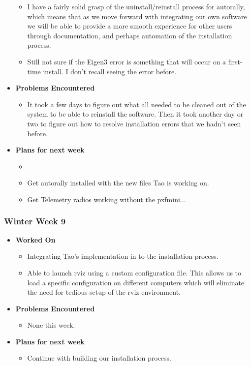 \documentclass{article}
\begin{document}
\begin{itemize}
\begin{itemize}
    \item I have a fairly solid grasp of the uninstall/reinstall process for autorally, which means that as we move forward with integrating our own software we will be able to provide a more smooth experience for other users through documentation, and perhaps automation of the installation process.

    \item Still not sure if the Eigen3 error is something that will occur on a first-time install. I don't recall seeing the error before.

    \end{itemize}

    \item {\textbf{Problems Encountered}}
    \begin{itemize}
        \item It took a few days to figure out what all needed to be cleaned out of the system to be able to reinstall the software. Then it took another day or two to figure out how to resolve installation errors that we hadn't seen before.
    \end{itemize}

    \item{\textbf{Plans for next week}}
    \begin{itemize}
        \item         \item Get autorally installed with the new files Tao is working on.
        \item Get Telemetry radios working without the pxfmini...
    \end{itemize}
\end{itemize}

\subsubsection{Winter Week 9}
\begin{itemize}
    \item {\textbf{Worked On}}
    \begin{itemize}
        \item Integrating Tao's implementation in to the installation process.
        \item Able to launch rviz using a custom configuration file. This allows us to load a specific configuration on different computers which will eliminate the need for tedious setup of the rviz environment.
    \end{itemize}

    \item {\textbf{Problems Encountered}}
    \begin{itemize}
        \item None this week.
    \end{itemize}

    \item{\textbf{Plans for next week}}
    \begin{itemize}
        \item Continue with building our installation process.
    \end{itemize}
\end{itemize}
\end{document}
